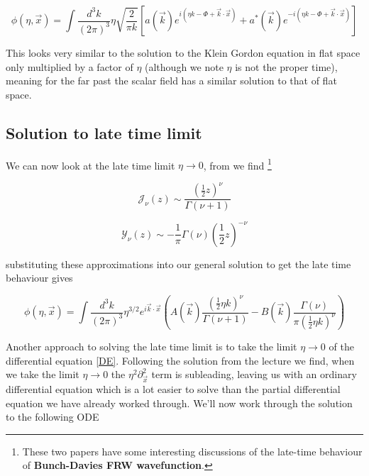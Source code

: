 \documentclass[a4paper,11pt]{article}
\numberwithin{equation}{section}
\numberwithin{figure}{section}
\begin{document}
\begin{large}
\begin{equation}
\label{genKGsol eta>>1}    
    \phi(\eta,\Vec{x})=\int \frac{d^3k}{(2\pi)^3}\eta\sqrt{\frac{2}{\pi k}}\left[a(\Vec{k})e^{i(\eta k-\Phi+\Vec{k}\cdot\Vec{x})}+a^*(\Vec{k})e^{-i(\eta k-\Phi+\Vec{k}\cdot\Vec{x})} \right]
\end{equation}

This looks very similar to the solution to the Klein Gordon equation in flat space only multiplied by a factor of $\eta$ (although we note $\eta$ is not the proper time), meaning for the far past the scalar field has a similar solution to that of flat space.



\subsection{Solution to late time limit}

We can now look at the late time limit $\eta\rightarrow0$, from \cite{nist-dlmf} we find \footnote{These two papers \cite{Konstantinidis_2016,Anninos_2015} have  some interesting discussions of the late-time behaviour of \textbf{Bunch-Davies {FRW} wavefunction}. }

\begin{equation}
\label{J(z) z<<1}    
    \mathcal{J}_\nu(z)\sim \frac{(\frac{1}{2}z)^\nu}{\Gamma (\nu+1)}
\end{equation}

\begin{equation}
\label{Y(z) z<<1}    
    \mathcal{Y}_\nu(z)\sim -\frac{1}{\pi} \Gamma (\nu)(\frac{1}{2}z)^{-\nu}
\end{equation}

\newpage

substituting these approximations into our general solution to get the late time behaviour gives

\begin{equation}
\label{genKGsol eta<<1}    
    \phi(\eta,\Vec{x})=\int \frac{d^3k}{(2\pi)^3}\eta^{3/2}e^{i\Vec{k}\cdot\Vec{x}}\left(A(\Vec{k}) \frac{(\frac{1}{2}\eta k)^\nu}{\Gamma(\nu+1)}-B(\Vec{k})\frac{\Gamma(\nu)}{\pi(\frac{1}{2}\eta k)^\nu}\right)
\end{equation}

\vspace{1cm}

Another approach to solving the late time limit is to take the limit $\eta\rightarrow0$ of the differential equation \eqref{DE}. Following the solution from the lecture \cite{anninos2018aspect,anninos2018topics} we find, when we take the limit $\eta\rightarrow0$ the $\eta^2\partial^2_{\Vec{x}}$ term is subleading, leaving us with an ordinary differential equation which is a lot easier to solve than the partial differential equation we have already worked through. We'll now work through the solution to the following ODE


\end{large}
\end{document}
